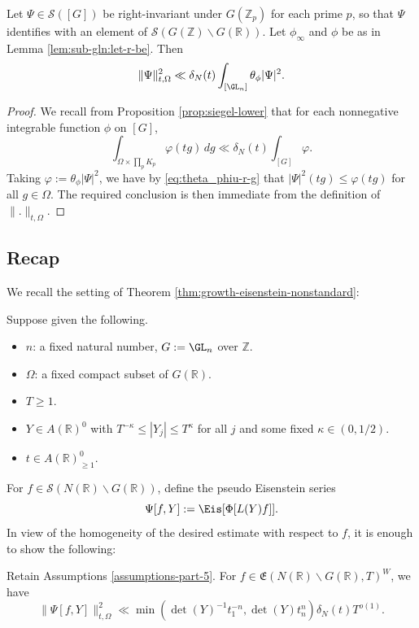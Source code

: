 \begin{corollary}\label{cor:sub-gln:let-psi-in}
  Let $\Psi \in \mathcal{S}([G])$ be right-invariant under $G(\mathbb{Z}_p)$ for each prime $p$, so that $\Psi$ identifies with an element of $\mathcal{S}(G(\mathbb{Z}) \backslash G(\mathbb{R}))$.  Let $\phi_\infty$ and $\phi$ be as in Lemma \ref{lem:sub-gln:let-r-be}.   Then
  \begin{equation*}
    \|\Psi \|_{t,\Omega}^2
    \ll
    \delta_N(t)
    \int_{[\GL_n]} \theta_\phi |\Psi|^2.
  \end{equation*}
\end{corollary}
\begin{proof}
  We recall from Proposition \ref{prop:siegel-lower} that for each nonnegative integrable function $\phi$ on $[G]$,
  \begin{equation*}
    \int_{\Omega \times \prod_p K_p} \varphi(t g) \, d g \ll \delta_N(t) \int_{[G]} \varphi.
  \end{equation*}
  Taking $\varphi := \theta_\phi |\Psi|^2$, we have by  \eqref{eq:theta_phiu-r-g} that $|\Psi|^2(t g) \leq \varphi(t g)$ for all $g \in \Omega$.  The required conclusion is then immediate from the definition of $\|.\|_{t,\Omega}$.
\end{proof}



\subsection{Recap}
We recall the setting of Theorem \ref{thm:growth-eisenstein-nonstandard}:
\begin{assumptions}\label{assumptions-part-5}
  Suppose given the following.
  \begin{itemize}
  \item $n$: a fixed natural number, $G := \GL_n$ over $\mathbb{Z}$.
  \item $\Omega$: a fixed compact subset of $G(\mathbb{R})$.
  \item $T \geq 1$.
  \item $Y \in A(\mathbb{R})^0$ with $T^{-\kappa} \leq |Y_j| \leq T^{\kappa}$ for all $j$ and some fixed $\kappa \in (0,1/2)$.
  \item $t \in A(\mathbb{R})^0_{\geq 1}$.
  \end{itemize}
\end{assumptions}
For $f \in \mathcal{S}(N(\mathbb{R}) \backslash G(\mathbb{R}))$, define  the pseudo Eisenstein series
\begin{equation*}
  \Psi[f,Y] := \Eis[\Phi[L(Y) f]].
\end{equation*}
In view of the homogeneity of the desired estimate with respect to $f$, it is enough to show the following:
\begin{theorem}
  Retain Assumptions \ref{assumptions-part-5}.  For $f \in \mathfrak{E}(N(\mathbb{R}) \backslash G(\mathbb{R}), T)^W$, we have
  \begin{equation}\label{eq:psiy_r2-ll-dety}
    \|\Psi[f,Y]\|_{t,\Omega}^2 \ll \min ( \det(Y)^{-1} t_1^{-n}, \det(Y) t_n^n ) \delta_N(t) T^{o(1)}.
  \end{equation}
\end{theorem}

